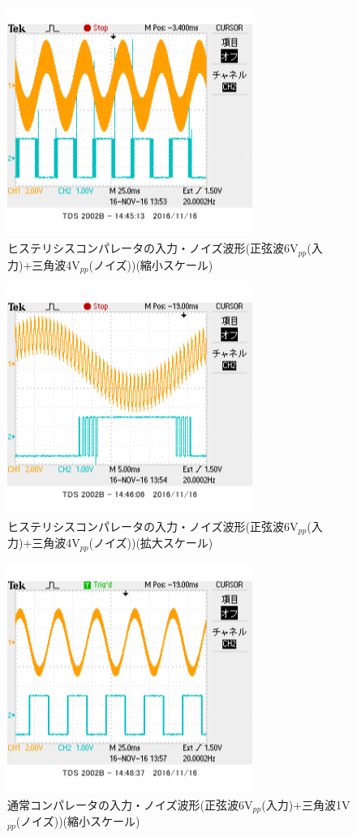 \documentclass[11pt,a4j]{jsarticle}
\begin{document}
 \begin{figure}[htbp]
  \centering
  \includegraphics[width=8cm,clip]{1_2_noise_before_6-4_BigScale}
  \caption{ヒステリシスコンパレータの入力・ノイズ波形(正弦波6V$_{pp}$(入力)+三角波4V$_{pp}$(ノイズ))(縮小スケール)}
  \label{fig:noise_before_6-4_big}
 \end{figure}
 
 \begin{figure}[htbp]
  \centering
  \includegraphics[width=8cm,clip]{1_2_noise_before_6-4_SmallScale.png}
  \caption{ヒステリシスコンパレータの入力・ノイズ波形(正弦波6V$_{pp}$(入力)+三角波4V$_{pp}$(ノイズ))(拡大スケール)}
  \label{fig:noise_before_6-4_small}
 \end{figure}
 
 \begin{figure}[htbp]
  \centering
  \includegraphics[width=8cm,clip]{1_2_noise_after_6-1_BigScale.png}
  \caption{通常コンパレータの入力・ノイズ波形(正弦波6V$_{pp}$(入力)+三角波1V$_{pp}$(ノイズ))(縮小スケール)}
  \label{fig:noise_after_6-1_big}
 \end{figure}
 
\end{document}
